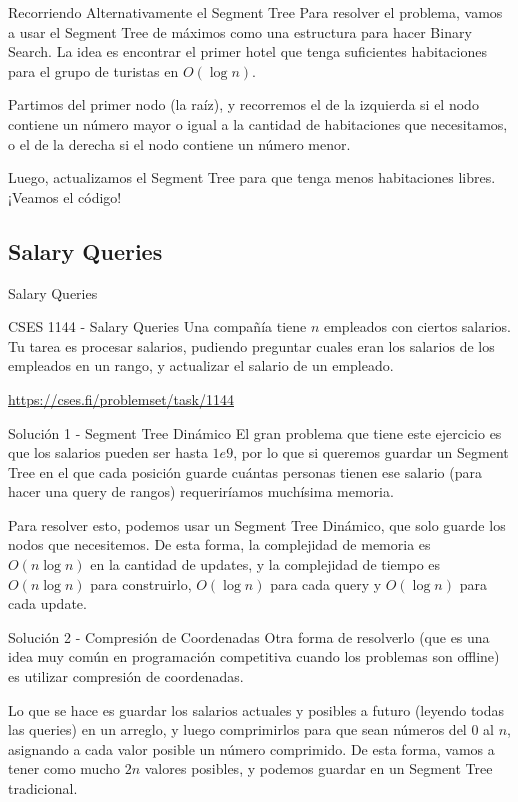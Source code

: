 \documentclass{beamer}
\begin{document}
\begin{frame}{Recorriendo Alternativamente el Segment Tree}
Para resolver el problema, vamos a usar el Segment Tree de máximos como una estructura para hacer Binary Search. La idea es encontrar el primer hotel que tenga suficientes habitaciones para el grupo de turistas en $O(\log n)$.

\pause
Partimos del primer nodo (la raíz), y recorremos el de la izquierda si el nodo contiene un número mayor o igual a la cantidad de habitaciones que necesitamos, o el de la derecha si el nodo contiene un número menor.

\pause
Luego, actualizamos el Segment Tree para que tenga menos habitaciones libres. ¡Veamos el código!
\end{frame}

\subsection{Salary Queries}
\begin{frame}{Salary Queries}
\begin{block}{CSES 1144 - Salary Queries}
Una compañía tiene $n$ empleados con ciertos salarios. Tu tarea es procesar salarios, pudiendo preguntar cuales eran los salarios de los empleados en un rango, y actualizar el salario de un empleado.
\end{block}

\url{https://cses.fi/problemset/task/1144}
\end{frame}

\begin{frame}{Solución 1 - Segment Tree Dinámico}
El gran problema que tiene este ejercicio es que los salarios pueden ser hasta $1e9$, por lo que si queremos guardar un Segment Tree en el que cada posición guarde cuántas personas tienen ese salario (para hacer una query de rangos) requeriríamos muchísima memoria.

\pause
Para resolver esto, podemos usar un Segment Tree Dinámico, que solo guarde los nodos que necesitemos. De esta forma, la complejidad de memoria es $O(n\log n)$ en la cantidad de updates, y la complejidad de tiempo es $O(n\log n)$ para construirlo, $O(\log n)$ para cada query y $O(\log n)$ para cada update.
\end{frame}

\begin{frame}{Solución 2 - Compresión de Coordenadas}
Otra forma de resolverlo (que es una idea muy común en programación competitiva cuando los problemas son offline) es utilizar compresión de coordenadas.

\pause
Lo que se hace es guardar los salarios actuales y posibles a futuro (leyendo todas las queries) en un arreglo, y luego comprimirlos para que sean números del $0$ al $n$, asignando a cada valor posible un número comprimido. De esta forma, vamos a tener como mucho $2n$ valores posibles, y podemos guardar en un Segment Tree tradicional.
\end{frame}
\end{document}
